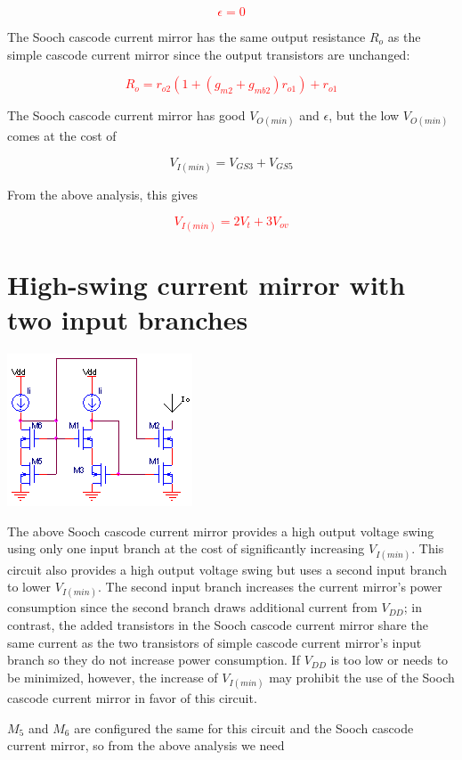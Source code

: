 \textcolor{red}{
\begin{equation}
\epsilon = 0
\end{equation}
}

\par
The Sooch cascode current mirror has the same output resistance $R_{o}$ as the simple cascode current mirror since the output transistors are unchanged:

\textcolor{red}{
\begin{equation}
R_{o} = r_{o2}(1+(g_{m2}+g_{mb2})r_{o1})+ r_{o1}
\end{equation}
}

\par
The Sooch cascode current mirror has good $V_{O(min)}$ and $\epsilon$, but the low $V_{O(min)}$ comes at the cost of

\begin{equation}
V_{I(min)} = V_{GS3} + V_{GS5}
\end{equation}

From the above analysis, this gives

\textcolor{red}{
\begin{equation}
V_{I(min)} = 2V_{t} + 3V_{ov}
\end{equation}
}

\section{High-swing current mirror with two input branches}
\begin{center}
	\includegraphics{schematics/highswingcascodecurrentmirror.PNG}
\end{center}
The above Sooch cascode current mirror provides a high output voltage swing using only one input branch at the cost of significantly increasing $V_{I(min)}$. This circuit also provides a high output voltage swing but uses a second input branch to lower $V_{I(min)}$. The second input branch increases the current mirror's power consumption since the second branch draws additional current from $V_{DD}$; in contrast, the added transistors in the Sooch cascode current mirror share the same current as the two transistors of simple cascode current mirror's input branch so they do not increase power consumption. If $V_{DD}$ is too low or needs to be minimized, however, the increase of $V_{I(min)}$ may prohibit the use of the Sooch cascode current mirror in favor of this circuit.
\par
$M_{5}$ and $M_{6}$ are configured the same for this circuit and the Sooch cascode current mirror, so from the above analysis we need

